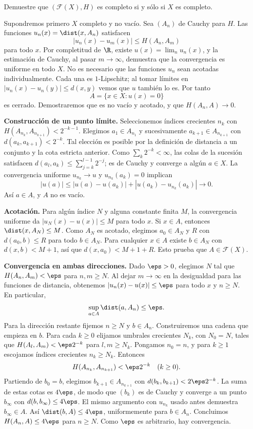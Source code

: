 \begin{ejercicio}\label{ej:lectura-11-5}\label{ch11:hiper-completo}
Demuestre que $(\mathcal F(X),H)$ es completo si y sólo si $X$ es completo.
\end{ejercicio}
\begin{solucion}
Supondremos primero $X$ completo y no vacío. Sea $(A_n)$ de Cauchy para $H$. Las funciones $u_n(x)=\dist(x,A_n)$ satisfacen
\[
 |u_n(x)-u_m(x)|\leq H(A_n,A_m)
\]
para todo $x$. Por completitud de $\R$, existe $u(x)=\lim_nu_n(x)$, y la estimación de Cauchy, al pasar $m\to\infty$, demuestra que la convergencia es uniforme en todo $X$. No es necesario que las funciones $u_n$ sean acotadas individualmente. Cada una es $1$-Lipschitz; al tomar límites en $|u_n(x)-u_n(y)|\leq d(x,y)$ vemos que $u$ también lo es. Por tanto
\[
 A=\{x\in X:u(x)=0\}
\]
es cerrado. Demostraremos que es no vacío y acotado, y que $H(A_n,A)\to0$.

\textbf{Construcción de un punto límite.} Seleccionemos índices crecientes $n_k$ con $H(A_{n_k},A_{n_{k+1}})<2^{-k-1}$. Elegimos $a_1\in A_{n_1}$ y sucesivamente $a_{k+1}\in A_{n_{k+1}}$ con $d(a_k,a_{k+1})<2^{-k}$. Tal elección es posible por la definición de distancia a un conjunto y la cota estricta anterior. Como $\sum_k2^{-k}<\infty$, las colas de la sucesión satisfacen $d(a_l,a_k)\leq\sum_{j=k}^{l-1}2^{-j}$; es de Cauchy y converge a algún $a\in X$. La convergencia uniforme $u_{n_k}\to u$ y $u_{n_k}(a_k)=0$ implican
\[
 |u(a)|\leq |u(a)-u(a_k)|+|u(a_k)-u_{n_k}(a_k)|\longrightarrow0.
\]
Así $a\in A$, y $A$ no es vacío.

\textbf{Acotación.} Para algún índice $N$ y alguna constante finita $M$, la convergencia uniforme da $|u_N(x)-u(x)|\leq M$ para todo $x$. Si $x\in A$, entonces $\dist(x,A_N)\leq M$. Como $A_N$ es acotado, elegimos $a_0\in A_N$ y $R$ con $d(a_0,b)\leq R$ para todo $b\in A_N$. Para cualquier $x\in A$ existe $b\in A_N$ con $d(x,b)<M+1$, así que $d(x,a_0)<M+1+R$. Esto prueba que $A\in\mathcal F(X)$.

\textbf{Convergencia en ambas direcciones.} Dado $\eps>0$, elegimos $N$ tal que $H(A_n,A_m)<\eps$ para $n,m\geq N$. Al dejar $m\to\infty$ en la desigualdad para las funciones de distancia, obtenemos $|u_n(x)-u(x)|\leq\eps$ para todo $x$ y $n\geq N$. En particular,
\[
 \sup_{a\in A}\dist(a,A_n)\leq\eps.
\]
Para la dirección restante fijemos $n\geq N$ y $b\in A_n$. Construiremos una cadena que empieza en $b$. Para cada $k\geq0$ elijamos umbrales crecientes $N_k$, con $N_0=N$, tales que $H(A_l,A_m)<\eps2^{-k}$ para $l,m\geq N_k$. Pongamos $n_0=n$, y para $k\geq1$ escojamos índices crecientes $n_k\geq N_k$. Entonces
\[
 H(A_{n_k},A_{n_{k+1}})<\eps2^{-k}\quad(k\geq0).
\]
Partiendo de $b_0=b$, elegimos $b_{k+1}\in A_{n_{k+1}}$ con $d(b_k,b_{k+1})<2\eps2^{-k}$. La suma de estas cotas es $4\eps$, de modo que $(b_k)$ es de Cauchy y converge a un punto $b_\infty$ con $d(b,b_\infty)\leq4\eps$. El mismo argumento con $u_{n_k}$ usado antes demuestra $b_\infty\in A$. Así $\dist(b,A)\leq4\eps$, uniformemente para $b\in A_n$. Concluimos $H(A_n,A)\leq4\eps$ para $n\geq N$. Como $\eps$ es arbitrario, hay convergencia.


\end{solucion}
